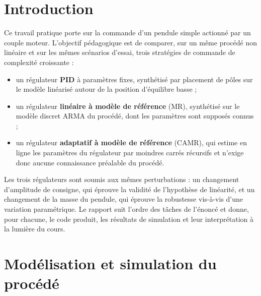 \documentclass[11pt,a4paper]{report}
\begin{document}


\tableofcontents
\clearpage

\chapter*{Introduction}

Ce travail pratique porte sur la commande d'un pendule simple actionné par un couple moteur.
L'objectif pédagogique est de comparer, sur un même procédé non linéaire et sur les mêmes
scénarios d'essai, trois stratégies de commande de complexité croissante :

\begin{itemize}
  \item un régulateur \textbf{PID} à paramètres fixes, synthétisé par placement de pôles sur le
        modèle linéarisé autour de la position d'équilibre basse ;
  \item un régulateur \textbf{linéaire à modèle de référence} (MR), synthétisé sur le modèle
        discret ARMA du procédé, dont les paramètres sont supposés connus ;
  \item un régulateur \textbf{adaptatif à modèle de référence} (CAMR), qui estime en ligne les
        paramètres du régulateur par moindres carrés récursifs et n'exige donc aucune
        connaissance préalable du procédé.
\end{itemize}

Les trois régulateurs sont soumis aux mêmes perturbations : un changement d'amplitude de
consigne, qui éprouve la validité de l'hypothèse de linéarité, et un changement de la masse du
pendule, qui éprouve la robustesse vis-à-vis d'une variation paramétrique. Le rapport suit
l'ordre des tâches de l'énoncé et donne, pour chacune, le code produit, les résultats de
simulation et leur interprétation à la lumière du cours.

\chapter{Modélisation et simulation du procédé}
\end{document}
